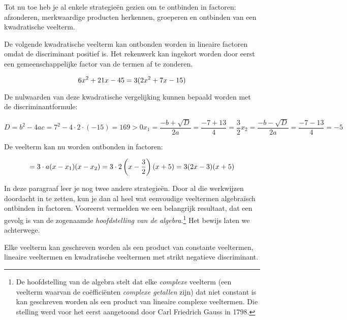 \documentclass{ximera}
\begin{document}
	\author{Koen de Naeghel - Wiskunde Op Maat}
    \xmsource


Tot nu toe heb je al enkele strategieën gezien om te ontbinden in factoren: afzonderen, merkwaardige producten herkennen, groeperen en ontbinden van een kwadratische veelterm.

\begin{example} 
De volgende kwadratische veelterm kan ontbonden worden in lineaire factoren omdat de discriminant positief is. Het rekenwerk kan ingekort worden door eerst een gemeenschappelijke factor van de termen af te zonderen. 

\[
6x^2+21x-45 = 3(2x^2 + 7x - 15) \\
\]

De nulwaarden van deze kwadratische vergelijking kunnen bepaald worden met de discriminantformule: 

\[
D = b^2 - 4ac = 7^2-4\cdot 2 \cdot (-15) = 169 > 0 
x_{1} = \frac{-b + \sqrt{D}}{2a} = \frac{-7 + 13}{4} = \frac{3}{2} 
x_{2} = \frac{-b - \sqrt{D}}{2a} = \frac{-7 - 13}{4} = -5
\]

De veelterm kan nu worden ontbonden in factoren: 

\[
= 3 \cdot a(x-x_1)(x-x_2) \\
= 3 \cdot 2\left(x- \frac{3}{2}\right)(x+5) \\
= 3(2x-3)(x+5)
\]
\end{example} 

In deze paragraaf leer je nog twee andere strategieën. Door al die werkwijzen doordacht in te zetten, kun je dan al heel wat eenvoudige veeltermen algebraïsch ontbinden in factoren. Vooreerst vermelden we een belangrijk resultaat, dat een gevolg is van de zogenaamde \textit{ hoofdstelling van de algebra}.\footnote{De hoofdstelling van de algebra stelt dat elke \textit{ complexe} veelterm (een veelterm waarvan de coëfficiënten \textit{ complexe getallen} zijn) dat niet constant is kan geschreven worden als een product van lineaire complexe veeltermen. Die stelling werd voor het eerst aangetoond door Carl Friedrich Gauss in 1798.} Het bewijs laten we achterwege.

\begin{theorem} 
Elke veelterm kan geschreven worden als een product van constante veeltermen, lineaire veel\-termen en kwadratische veeltermen met strikt negatieve discriminant.
\end{theorem} 
\end{document}
